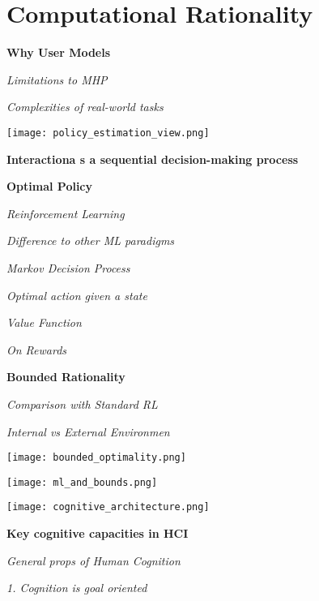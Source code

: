 \section{Computational Rationality}

\textbf{Why User Models}

\textit{Limitations to MHP} \smallskip

\textit{Complexities of real-world tasks} \smallskip


\begin{center}
	\texttt{[image: policy\_estimation\_view.png]}
\end{center}


\textbf{Interactiona s a sequential decision-making process}

\textbf{Optimal Policy}


\textit{Reinforcement Learning} \smallskip


\textit{Difference to other ML paradigms} \smallskip


\textit{Markov Decision Process} \smallskip




\textit{Optimal action given a state} \smallskip


\textit{Value Function} \smallskip

\textit{On Rewards} \smallskip




\textbf{Bounded Rationality}


\textit{Comparison with Standard RL} \smallskip

\textit{Internal vs External Environmen} \smallskip

\begin{center}
	\texttt{[image: bounded\_optimality.png]}
\end{center}


\begin{center}
	\texttt{[image: ml\_and\_bounds.png]}
\end{center}




\begin{center}
	\texttt{[image: cognitive\_architecture.png]}
\end{center}


\textbf{Key cognitive capacities in HCI} \smallskip


\textit{General props of Human Cognition} \smallskip


\textit{1. Cognition is goal oriented} \smallskip


